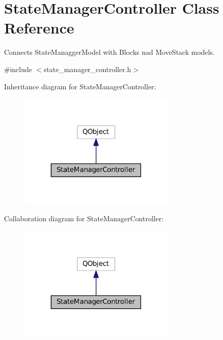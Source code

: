 \hypertarget{class_state_manager_controller}{}\section{State\+Manager\+Controller Class Reference}
\label{class_state_manager_controller}


Connects State\+Managger\+Model with Blocks nad Move\+Stack models.  




{\ttfamily \#include $<$state\+\_\+manager\+\_\+controller.\+h$>$}



Inheritance diagram for State\+Manager\+Controller\+:
\nopagebreak
\begin{figure}[H]
\begin{center}
\leavevmode
\includegraphics[width=213pt]{class_state_manager_controller__inherit__graph}
\end{center}
\end{figure}


Collaboration diagram for State\+Manager\+Controller\+:
\nopagebreak
\begin{figure}[H]
\begin{center}
\leavevmode
\includegraphics[width=213pt]{class_state_manager_controller__coll__graph}
\end{center}
\end{figure}
